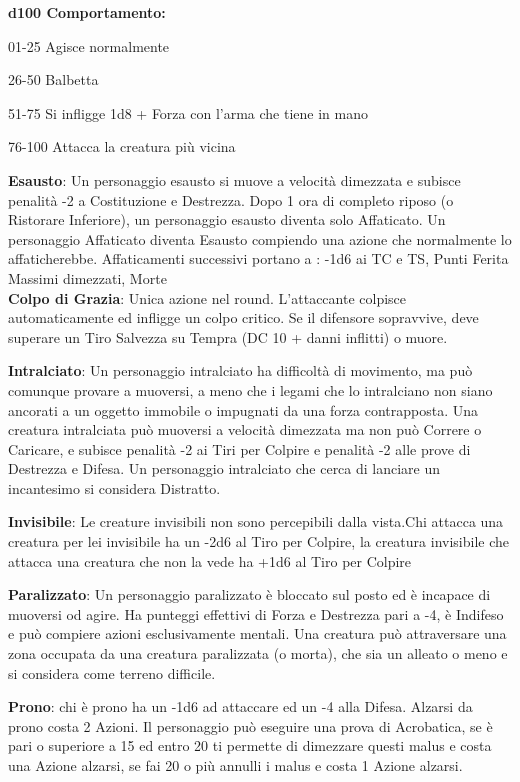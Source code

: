 \documentclass[a4paper,12 pt,openany]{book}
\begin{document}
\begin{textblock*}{19 cm}
\begin{multicols}{2}
\textbf{d100 Comportamento:}

01-25 Agisce normalmente

26-50 Balbetta

51-75 Si infligge 1d8 + Forza con l'arma che tiene in mano

76-100 Attacca la creatura più vicina

\textbf{Esausto}: Un personaggio esausto si muove a velocità dimezzata e subisce penalità -2 a Costituzione e Destrezza. Dopo 1 ora di completo riposo (o Ristorare Inferiore), un personaggio esausto diventa solo Affaticato. Un personaggio Affaticato diventa Esausto compiendo una azione che normalmente lo affaticherebbe.
Affaticamenti successivi portano a : -1d6 ai TC e TS, Punti Ferita Massimi dimezzati, Morte\\

\textbf{Colpo di Grazia}: Unica azione nel round. L'attaccante colpisce automaticamente ed infligge un colpo critico. Se il difensore sopravvive, deve superare un Tiro Salvezza su Tempra (DC 10 + danni inflitti) o muore.

\textbf{Intralciato}: Un personaggio intralciato ha difficoltà di movimento, ma può comunque provare a muoversi, a meno che i legami che lo intralciano non siano ancorati a un oggetto immobile o impugnati da una forza contrapposta.
Una creatura intralciata può muoversi a velocità dimezzata ma non può Correre o Caricare, e subisce penalità -2 ai Tiri per Colpire e penalità -2 alle prove di Destrezza e Difesa.
Un personaggio intralciato che cerca di lanciare un incantesimo si considera Distratto.

\textbf{Invisibile}: Le creature invisibili non sono percepibili dalla vista.Chi attacca una creatura per lei invisibile ha un -2d6 al Tiro per Colpire, la creatura invisibile che attacca una creatura che non la vede ha +1d6 al Tiro per Colpire

\textbf{Paralizzato}: Un personaggio paralizzato è bloccato sul posto ed è incapace di muoversi od agire. Ha punteggi effettivi di Forza e Destrezza pari a -4, è Indifeso e può compiere azioni esclusivamente mentali.
Una creatura può attraversare una zona occupata da una creatura paralizzata (o morta), che sia un alleato o meno e si considera come terreno difficile.

\textbf{Prono}: chi è prono ha un -1d6 ad attaccare ed un -4 alla Difesa. Alzarsi da prono costa 2 Azioni.
Il personaggio può eseguire una prova di Acrobatica, se è pari o superiore a 15 ed entro 20 ti permette di dimezzare questi malus e costa una Azione alzarsi, se fai 20 o più annulli i malus e costa 1 Azione alzarsi.


\end{multicols}
\end{textblock*}
\end{document}
